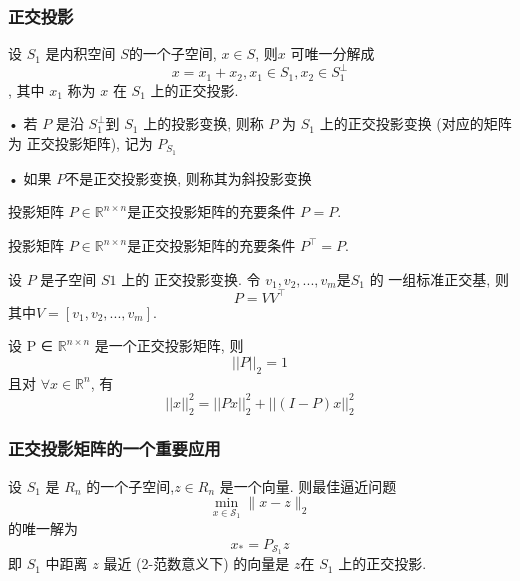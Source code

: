 \documentclass[12pt,a4paper]{article}
\begin{document}
\subsubsection{正交投影}
设 $S_1$ 是内积空间 $S $的一个子空间, $x ∈ S$, 则$x$ 可唯一分解成
$$x = x_1 + x_2, x_1 ∈ S_1, x_2 ∈ S^{⊥}_1$$
,
其中 $x_1$ 称为 $x$ 在 $S_1$ 上的正交投影.

• 若 $P$ 是沿 $S^{⊥}_1 $到 $S_1$ 上的投影变换, 则称 $P$ 为 $S_1$ 上的正交投影变换
(对应的矩阵为 正交投影矩阵), 记为 $P_{S_1}$

• 如果 $P $不是正交投影变换, 则称其为斜投影变换

\begin{framed}
	\begin{theorem}
		投影矩阵 $P ∈\mathbb{R}^{n×n}$是正交投影矩阵的充要条件 $P^{} = P$.
	\end{theorem}
\end{framed}

\begin{framed}
	\begin{theorem}
		投影矩阵 $P ∈\mathbb{R}^{n×n}$是正交投影矩阵的充要条件 $P^{\top} = P$.
	\end{theorem}
\end{framed}

\begin{framed}
	\begin{corollary}
		设 $P$ 是子空间 $S1$ 上的 正交投影变换. 令 $v_1, v_2, . . . , v_m $是$ S_1$ 的
		一组标准正交基, 则
		$$
		P=V V^{\top}
		$$
		其中$ V = [v_1, v_2, . . . , v_m].$
	\end{corollary}
\end{framed}

\begin{framed}
	\begin{property}
		设 P ∈ $\mathbb{R}^{n×n}$ 是一个正交投影矩阵, 则
		$$
		||P||_{2}=1
		$$
		且对 $∀ x ∈ \mathbb{R}^n$, 有
		$$
		||x||_{2}^{2}=||P x||_{2}^{2}+||(I-P) x||_{2}^{2}
		$$
	\end{property}
\end{framed}

\subsubsection{正交投影矩阵的一个重要应用}
\begin{framed}
	\begin{theorem}
		设 $S_1$ 是 $R_n$ 的一个子空间,$ z ∈ R_n$ 是一个向量. 则最佳逼近问题
	$$
	\min _{x \in \mathcal{S}_{1}}\|x-z\|_{2}
	$$
	的唯一解为
	 $$
	 x_{*}=P_{\mathcal{S}_{1}} z
	 $$
	 即 $S_1$ 中距离 $z$ 最近 (2-范数意义下) 的向量是 $z $在 $S
	 _1$ 上的正交投影.
	\end{theorem}
\end{framed}
\end{document}
